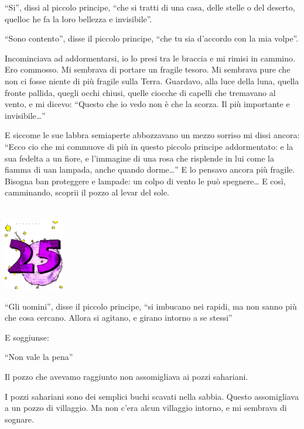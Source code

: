 \documentclass[11pt]{scrbook}
\begin{document}
``Si'', dissi al piccolo principe, ``che si tratti di una casa, delle
stelle o del deserto, quelloc he fa la loro bellezza e invisibile''.

``Sono contento'', disse il piccolo principe, ``che tu sia d'accordo con
la mia volpe''.

Incominciava ad addormentarsi, io lo presi tra le braccia e mi rimisi in
cammino. Ero commosso. Mi sembrava di portare un fragile tesoro. Mi
sembrava pure che non ci fosse niente di più fragile sulla Terra.
Guardavo, alla luce della luna, quella fronte pallida, quegli occhi
chiusi, quelle ciocche di capelli che tremavano al vento, e mi dicevo:
``Questo che io vedo non è che la scorza. Il più importante e
invisibile\ldots{}''

E siccome le sue labbra semiaperte abbozzavano un mezzo sorriso mi dissi
ancora: ``Ecco cio che mi commuove di più in questo piccolo principe
addormentato: e la sua fedelta a un fiore, e l'immagine di una rosa che
risplende in lui come la fiamma di uan lampada, anche quando
dorme\ldots{}'' E lo pensavo ancora più fragile. Bisogna ban proteggere
e lampade: un colpo di vento le può spegnere\ldots{} E così, camminando,
scoprii il pozzo al levar del sole.

\chapter{}
\begin{center}
\includegraphics{./img/chapter25.png}
\end{center}

``Gli uomini'', disse il piccolo principe, ``si imbucano nei rapidi, ma
non sanno più che cosa cercano. Allora si agitano, e girano intorno a se
stessi''

E soggiunse:

``Non vale la pena''

Il pozzo che avevamo raggiunto non assomigliava ai pozzi sahariani.

I pozzi sahariani sono dei semplici buchi scavati nella sabbia. Questo
assomigliava a un pozzo di villaggio. Ma non c'era alcun villaggio
intorno, e mi sembrava di sognare.
\end{document}
